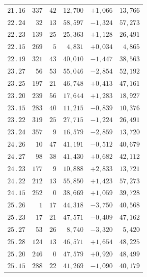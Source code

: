 \begin{center}
\begin{tabular}[t]{|c|r@{\;}r@{\;}r|r|r|}
$21\, .\, 16$ & $337$ & $42$ & $12{,}700$ & $+1{,}066$ & $13{,}766$\\[7pt]
$22\, .\, 24$ & $32$ & $13$ & $58{,}597$ & $-1{,}324$ & $57{,}273$\\
$22\, .\, 23$ & $139$ & $25$ & $25{,}363$ & $+1{,}128$ & $26{,}491$\\
$22\, .\, 15$ & $269$ & $5$ & $4{,}831$ & $+0{,}034$ & $4{,}865$\\
$22\, .\, 19$ & $321$ & $43$ & $40{,}010$ & $-1{,}447$ & $38{,}563$\\[7pt]
$23\, .\, 27$ & $56$ & $53$ & $55{,}046$ & $-2{,}854$ & $52{,}192$\\
$23\, .\, 25$ & $197$ & $21$ & $46{,}748$ & $+0{,}413$ & $47{,}161$\\
$23\, .\, 20$ & $239$ & $56$ & $17{,}644$ & $+1{,}283$ & $18{,}927$\\
$23\, .\, 15$ & $283$ & $40$ & $11{,}215$ & $-0{,}839$ & $10{,}376$\\
$23\, .\, 22$ & $319$ & $25$ & $27{,}715$ & $-1{,}224$ & $26{,}491$\\
$23\, .\, 24$ & $357$ & $9$ & $16{,}579$ & $-2{,}859$ & $13{,}720$\\[7pt]
$24\, .\, 26$ & $10$ & $47$ & $41{,}191$ & $-0{,}512$ & $40{,}679$\\
$24\, .\, 27$ & $98$ & $38$ & $41{,}430$ & $+0{,}682$ & $42{,}112$\\
$24\, .\, 23$ & $177$ & $9$ & $10{,}888$ & $+2{,}833$ & $13{,}721$\\
$24\, .\, 22$ & $212$ & $13$ & $55{,}850$ & $+1{,}423$ & $57{,}273$\\
$24\, .\, 15$ & $252$ & $0$ & $38{,}669$ & $+1{,}059$ & $39{,}728$\\[7pt]
$25\, .\, 26$ & $1$ & $17$ & $44{,}318$ & $-3{,}750$ & $40{,}568$\\
$25\, .\, 23$ & $17$ & $21$ & $47{,}571$ & $-0{,}409$ & $47{,}162$\\
$25\, .\, 27$ & $53$ & $26$ & $8{,}740$ & $-3{,}320$ & $5{,}420$\\
$25\, .\, 28$ & $124$ & $13$ & $46{,}571$ & $+1{,}654$ & $48{,}225$\\
$25\, .\, 20$ & $246$ & $0$ & $47{,}579$ & $+0{,}920$ & $48{,}499$\\
$25\, .\, 15$ & $288$ & $22$ & $41{,}269$ & $-1{,}090$ & $40{,}179$\\
\end{tabular}\hspace{1pt}%
\begin{tabular}[t]{|c|r@{\;}r@{\;}r|r|r|}\hline

\end{tabular}
\end{center}
